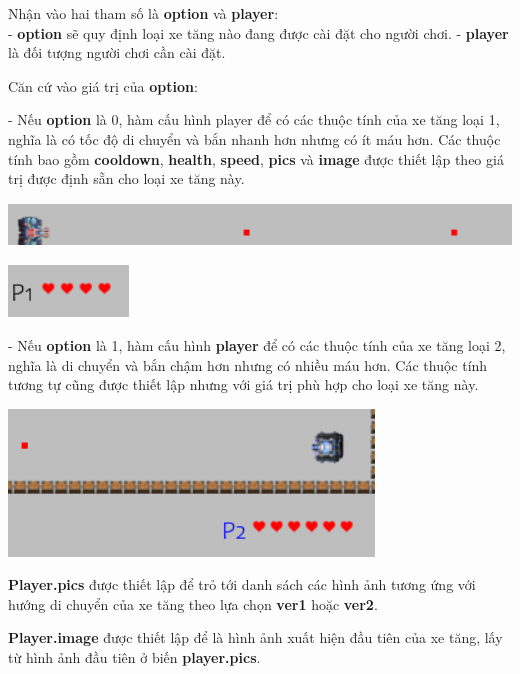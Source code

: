 \documentclass[a4paper]{article}
\begin{document}
Nhận vào hai tham số là \textbf{option} và \textbf{player}:\\
- \textbf{option} sẽ quy định loại xe tăng nào đang được cài đặt cho
người chơi. - \textbf{player} là đối tượng người chơi cần cài đặt.

Căn cứ vào giá trị của \textbf{option}:

- Nếu \textbf{option} là 0, hàm cấu hình player để có các thuộc tính của
xe tăng loại 1, nghĩa là có tốc độ di chuyển và bắn nhanh hơn nhưng có
ít máu hơn. Các thuộc tính bao gồm \textbf{cooldown}, \textbf{health},
\textbf{speed}, \textbf{pics} và \textbf{image} được thiết lập theo giá
trị được định sẵn cho loại xe tăng này.

\includegraphics[width=5.68611in,height=0.45833in]{image46.png}

\includegraphics[width=1.25972in,height=0.54167in]{image47.png}

- Nếu \textbf{option} là 1, hàm cấu hình \textbf{player} để có các thuộc
tính của xe tăng loại 2, nghĩa là di chuyển và bắn chậm hơn nhưng có
nhiều máu hơn. Các thuộc tính tương tự cũng được thiết lập nhưng với giá
trị phù hợp cho loại xe tăng này.

\includegraphics[width=3.82222in,height=1.54167in]{image48.png}

\textbf{Player.pics} được thiết lập để trỏ tới danh sách các hình ảnh
tương ứng với hướng di chuyển của xe tăng theo lựa chọn \textbf{ver1}
hoặc \textbf{ver2}.

\textbf{Player.image} được thiết lập để là hình ảnh xuất hiện đầu tiên
của xe tăng, lấy từ hình ảnh đầu tiên ở biến \textbf{player.pics}.
\end{document}
